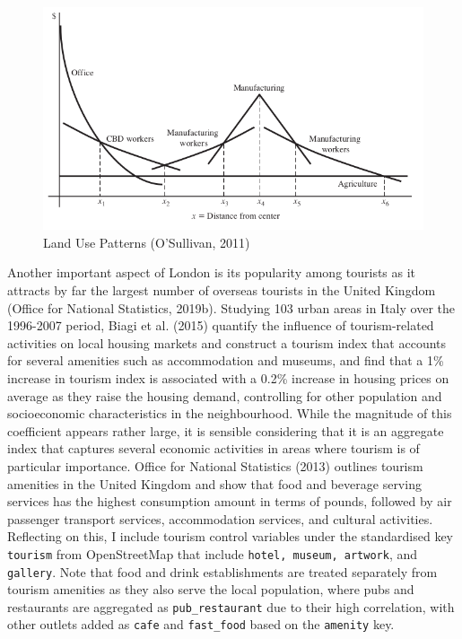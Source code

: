 \documentclass{article}
\begin{document}
\begin{figure}[t]
  \centering
  \includegraphics[width=0.8\linewidth]{images/land-use-patterns.png}
  \caption{Land Use Patterns (O'Sullivan, 2011)}
  \label{fig:landuse}
\end{figure}

Another important aspect of London is its popularity among tourists as it attracts by far the largest number of overseas tourists in the United Kingdom (Office for National Statistics, 2019b). Studying 103 urban areas in Italy over the 1996-2007 period, Biagi et al. (2015) quantify the influence of tourism-related activities on local housing markets and construct a tourism index that accounts for several amenities such as accommodation and museums, and find that a 1\% increase in tourism index is associated with a 0.2\% increase in housing prices on average as they raise the housing demand, controlling for other population and socioeconomic characteristics in the neighbourhood. While the magnitude of this coefficient appears rather large, it is sensible considering that it is an aggregate index that captures several economic activities in areas where tourism is of particular importance. Office for National Statistics (2013) outlines tourism amenities in the United Kingdom and show that food and beverage serving services has the highest consumption amount in terms of pounds, followed by air passenger transport services, accommodation services, and cultural activities. Reflecting on this, I include tourism control variables under the standardised key \texttt{tourism} from OpenStreetMap that include \texttt{hotel, museum, artwork}, and \texttt{gallery}. Note that food and drink establishments are treated separately from tourism amenities as they also serve the local population, where pubs and restaurants are aggregated as \texttt{pub\_restaurant} due to their high correlation, with other outlets added as \texttt{cafe} and \texttt{fast\_food} based on the \texttt{amenity} key.
\end{document}
